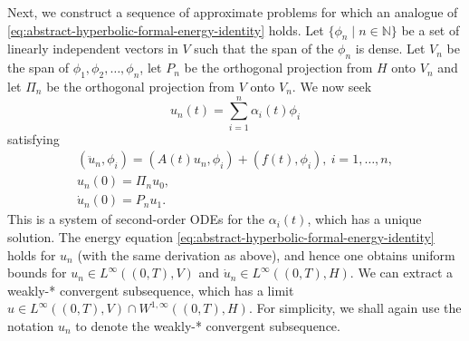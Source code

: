 Next, we construct a sequence of approximate problems for which an analogue of \eqref{eq:abstract-hyperbolic-formal-energy-identity} holds. Let $\{\phi_n\mid n\in\mathbb{N}\}$ be a set of linearly independent vectors in $V$ such that the span of the $\phi_n$ is dense. Let $V_n$ be the span of $\phi_1,\phi_2,\ldots,\phi_n$, let $P_n$ be the orthogonal projection from $H$ onto $V_n$ and let $\Pi_n$ be the orthogonal projection from $V$ onto $V_n$. We now seek
\begin{equation}\label{eq:abstract-hyperbolic-galerkin-finite-span-solution}
u_n(t)=\sum_{i=1}^n\alpha_i(t)\phi_i
\end{equation}
satisfying
\begin{equation}\label{eq:abstract-hyperbolic-galerkin-initial-value-system}
\begin{gathered}(\ddot u_n,\phi_i)=(A(t)u_n,\phi_i)+(f(t),\phi_i),\ i=1,\ldots,n,\\u_n(0)=\Pi_nu_0,\\\dot u_n(0)=P_nu_1.\end{gathered}
\end{equation}
This is a system of second-order ODEs for the $\alpha_i(t)$, which has a unique solution. The energy equation \eqref{eq:abstract-hyperbolic-formal-energy-identity} holds for $u_n$ (with the same derivation as above), and hence one obtains uniform bounds for $u_n\in L^\infty((0,T),V)$ and $\dot u_n\in L^\infty((0,T),H)$. We can extract a weakly-* convergent subsequence, which has a limit $u\in L^\infty((0,T),V)\cap W^{1,\infty}((0,T),H)$. For simplicity, we shall again use the notation $u_n$ to denote the weakly-* convergent subsequence.

